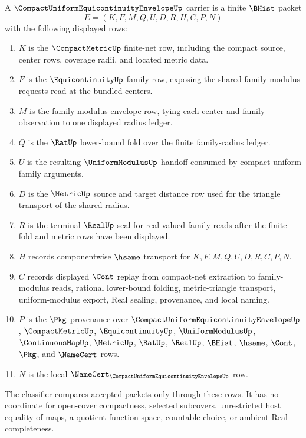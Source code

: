 \begin{definition}
\label{def:compact-uniform-equicontinuity-envelope-carrier}
A $\CompactUniformEquicontinuityEnvelopeUp$ carrier is a finite $\BHist$ packet
$$
E=(K,F,M,Q,U,D,R,H,C,P,N)
$$
with the following displayed rows:
\begin{enumerate}
\item $K$ is the $\CompactMetricUp$ finite-net row, including the compact source, center rows, coverage radii, and located metric data.
\item $F$ is the $\EquicontinuityUp$ family row, exposing the shared family modulus requests read at the bundled centers.
\item $M$ is the family-modulus envelope row, tying each center and family observation to one displayed radius ledger.
\item $Q$ is the $\RatUp$ lower-bound fold over the finite family-radius ledger.
\item $U$ is the resulting $\UniformModulusUp$ handoff consumed by compact-uniform family arguments.
\item $D$ is the $\MetricUp$ source and target distance row used for the triangle transport of the shared radius.
\item $R$ is the terminal $\RealUp$ seal for real-valued family reads after the finite fold and metric rows have been displayed.
\item $H$ records componentwise $\hsame$ transport for $K,F,M,Q,U,D,R,C,P,N$.
\item $C$ records displayed $\Cont$ replay from compact-net extraction to family-modulus reads, rational lower-bound folding, metric-triangle transport, uniform-modulus export, Real sealing, provenance, and local naming.
\item $P$ is the $\Pkg$ provenance over $\CompactUniformEquicontinuityEnvelopeUp$, $\CompactMetricUp$, $\EquicontinuityUp$, $\UniformModulusUp$, $\ContinuousMapUp$, $\MetricUp$, $\RatUp$, $\RealUp$, $\BHist$, $\hsame$, $\Cont$, $\Pkg$, and $\NameCert$ rows.
\item $N$ is the local $\NameCert_{\CompactUniformEquicontinuityEnvelopeUp}$ row.
\end{enumerate}
The classifier compares accepted packets only through these rows. It has no coordinate for open-cover compactness, selected subcovers, unrestricted host equality of maps, a quotient function space, countable choice, or ambient Real completeness.
\end{definition}

